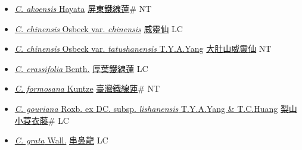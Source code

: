 \begin{itemize}
  \begin{itemize}
        \item[] \href{http://www.theplantlist.org/tpl1.1/search?q=Clematis+akoensis}{\textit{C. akoensis} Hayata}   \href{\detokenize{http://taibnet.sinica.edu.tw/chi/taibnet_species_list.php?T2=屏東鐵線蓮&T2_new_value=true&fr=y}}{屏東鐵線蓮}\# NT
        \item[] \href{http://www.theplantlist.org/tpl1.1/search?q=Clematis+chinensis+var.+chinensis}{\textit{C. chinensis} Osbeck var. \textit{chinensis}}   \href{\detokenize{http://taibnet.sinica.edu.tw/chi/taibnet_species_list.php?T2=威靈仙&T2_new_value=true&fr=y}}{威靈仙} LC
        \item[] \href{http://www.theplantlist.org/tpl1.1/search?q=Clematis+chinensis+var.+tatushanensis}{\textit{C. chinensis} Osbeck var. \textit{tatushanensis} T.Y.A.Yang}   \href{\detokenize{http://taibnet.sinica.edu.tw/chi/taibnet_species_list.php?T2=大肚山威靈仙&T2_new_value=true&fr=y}}{大肚山威靈仙} NT
        \item[] \href{http://www.theplantlist.org/tpl1.1/search?q=Clematis+crassifolia}{\textit{C. crassifolia} Benth.}   \href{\detokenize{http://taibnet.sinica.edu.tw/chi/taibnet_species_list.php?T2=厚葉鐵線蓮&T2_new_value=true&fr=y}}{厚葉鐵線蓮} LC
        \item[] \href{http://www.theplantlist.org/tpl1.1/search?q=Clematis+formosana}{\textit{C. formosana} Kuntze}   \href{\detokenize{http://taibnet.sinica.edu.tw/chi/taibnet_species_list.php?T2=臺灣鐵線蓮&T2_new_value=true&fr=y}}{臺灣鐵線蓮}\# NT
        \item[] \href{http://www.theplantlist.org/tpl1.1/search?q=Clematis+gouriana+subsp.+lishanensis}{\textit{C. gouriana} Roxb. ex DC. subsp. \textit{lishanensis} T.Y.A.Yang \& T.C.Huang}   \href{\detokenize{http://taibnet.sinica.edu.tw/chi/taibnet_species_list.php?T2=梨山小蓑衣藤&T2_new_value=true&fr=y}}{梨山小蓑衣藤}\# LC
        \item[] \href{http://www.theplantlist.org/tpl1.1/search?q=Clematis+grata}{\textit{C. grata} Wall.}   \href{\detokenize{http://taibnet.sinica.edu.tw/chi/taibnet_species_list.php?T2=串鼻龍&T2_new_value=true&fr=y}}{串鼻龍} LC

\end{itemize}
\end{itemize}
